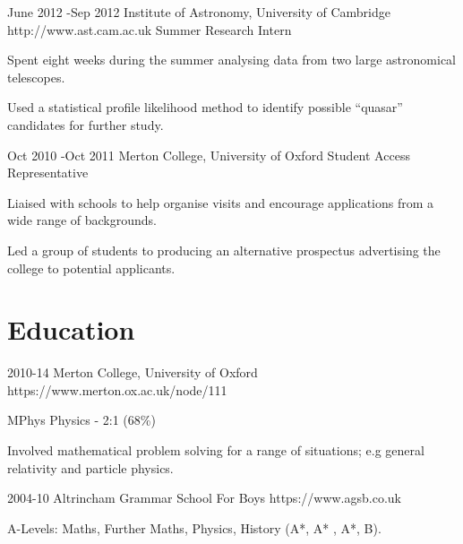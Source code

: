 \documentclass[10pt]{article} %
\begin{document}
\job
{June 2012 -}{Sep 2012}
{Institute of Astronomy, University of Cambridge}
{http://www.ast.cam.ac.uk}
{Summer Research Intern}
{\begin{itemize-noindent}
  \item{Spent eight weeks during the summer analysing data from two large astronomical telescopes.}
  \item{Used a statistical profile likelihood method to identify possible ``quasar'' candidates for further study.}
\end{itemize-noindent}}

\job
{Oct 2010 -}{Oct 2011}
{Merton College, University of Oxford}
{}
{Student Access Representative}
{\begin{itemize-noindent}
  \item{Liaised with schools to help organise visits and encourage applications from a wide range of backgrounds.}
  \item{Led a group of students to producing an alternative prospectus advertising the college to potential applicants.}
 \end{itemize-noindent}}


\section{Education}
\edu
{2010-14}
{Merton College, University of Oxford}
{https://www.merton.ox.ac.uk/node/111}
{
  \begin{itemize-noindent}
  \item{MPhys Physics - 2:1 (68\%)}
  \item{Involved mathematical problem solving for a range of situations; e.g general relativity and particle physics.}
  \end{itemize-noindent}
}

\edu
{2004-10}
{Altrincham Grammar School For Boys}
{https://www.agsb.co.uk}
{
  \begin{itemize-noindent}
  \item{A-Levels: Maths, Further Maths, Physics, History (A*, A* , A*, B).}
  \end{itemize-noindent}
}

\end{document}
